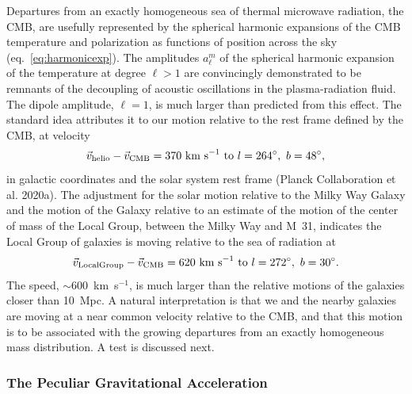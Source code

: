 \documentclass[fleqn,usenatbib]{mnras}
\newcommand{\beq}{\begin{equation}}
\newcommand{\eeq}{\end{equation}}
\begin{document}
Departures from an exactly homogeneous sea of thermal microwave radiation, the CMB, are usefully represented by the spherical harmonic expansions of the CMB temperature and polarization as functions of position across the sky (eq.~\ref{eq:harmonicexp}). The amplitudes $a_\ell^m$ of the spherical harmonic expansion of the temperature at degree $\ell > 1$ are convincingly demonstrated to be remnants of the decoupling of acoustic oscillations in the plasma-radiation fluid. The dipole amplitude, $\ell = 1$, is much larger than predicted from this effect. The standard idea attributes it to our motion relative to the rest frame defined by the CMB, at velocity  
\beq
{\vec v}_{\rm helio} - {\vec v}_{\rm CMB} = 370\hbox{ km s}^{-1}\hbox{ to } l = 264^\circ,\ b=48^\circ,\label{eq:heliocen_wrt_cmb}
\eeq
in galactic coordinates and the solar system rest frame (Planck Collaboration et al. 2020a). The adjustment for the solar motion relative to the Milky Way Galaxy and the motion of the Galaxy relative to an estimate of the motion of the center of mass of the Local Group, between the Milky Way and M~31, indicates the Local Group of galaxies is moving relative to the sea of radiation at  
\beq
{\vec v}_{\rm Local Group} - {\vec v}_{\rm CMB}= 620\hbox{ km s}^{-1}\hbox{ to } l = 272^\circ,\ b=30^\circ. \label{eq:LG_wrt_cmb}
\eeq
The speed, $\sim 600$~km~s$^{-1}$, is much larger than the relative motions of the galaxies closer than 10~Mpc. A natural interpretation is that we and the nearby galaxies are moving at a near common velocity relative to the CMB, and that this motion is to be associated with the growing departures from an exactly homogeneous mass distribution. A test is discussed next.

\subsubsection{The Peculiar Gravitational Acceleration} \label{sec:localgravity}
\end{document}
